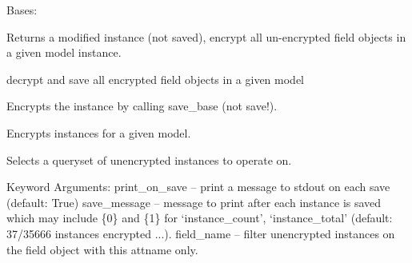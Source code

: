 \documentclass[letterpaper,10pt,english]{sphinxmanual}
\begin{document}
\begin{fulllineitems}
\label{base_classes:bhp_crypto.classes.ModelCryptor}
Bases: 

\begin{fulllineitems}
\label{base_classes:bhp_crypto.classes.ModelCryptor.decrypt_instance}
Returns a modified instance (not saved), encrypt all un-encrypted
field objects in a given model instance.

\end{fulllineitems}


\begin{fulllineitems}
\label{base_classes:bhp_crypto.classes.ModelCryptor.decrypt_model}
decrypt and save all encrypted field objects in a given model

\end{fulllineitems}


\begin{fulllineitems}
\label{base_classes:bhp_crypto.classes.ModelCryptor.encrypt_instance}
Encrypts the instance by calling save\_base (not save!).

\end{fulllineitems}


\begin{fulllineitems}
\label{base_classes:bhp_crypto.classes.ModelCryptor.encrypt_model}
Encrypts instances for a given model.

Selects a queryset of unencrypted instances to operate on.

Keyword Arguments:
print\_on\_save -- print a message to stdout on each save (default: True)
save\_message -- message to print after each instance is saved which may include \{0\}
and \{1\} for `instance\_count', `instance\_total' (default: 37/35666 instances encrypted ...).
field\_name -- filter unencrypted instances on the field object with this attname only.


\end{fulllineitems}
\end{fulllineitems}
\end{document}

